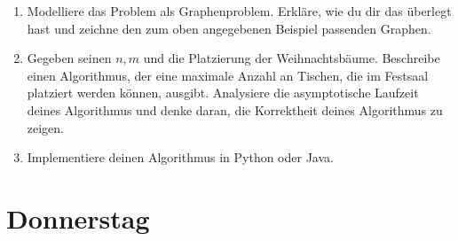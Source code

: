 \documentclass{uebung_cs}
\begin{document}
\begin{aufgabe}[Weihnachtsbäume]
    
    \vspace{4mm}
    \begin{enumerate}
    	\item Modelliere das Problem als Graphenproblem. Erkläre, wie du dir das überlegt hast und zeichne den zum oben angegebenen Beispiel passenden Graphen.\\
    	\item Gegeben seinen $n,m$ und die Platzierung der Weihnachtsbäume. Beschreibe einen Algorithmus, der eine maximale Anzahl an Tischen, die im Festsaal platziert werden können, ausgibt. Analysiere die asymptotische Laufzeit deines Algorithmus und denke daran, die Korrektheit deines Algorithmus zu zeigen.\\
    	\item Implementiere deinen Algorithmus in Python oder Java.
    \end{enumerate}
\end{aufgabe}

\section*{Donnerstag}
\end{document}

